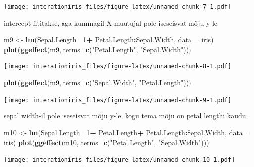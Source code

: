 \documentclass[]{book}
\newenvironment{Shaded}{\begin{snugshade}}{\end{snugshade}}
\newcommand{\KeywordTok}[1]{\textcolor[rgb]{0.13,0.29,0.53}{\textbf{#1}}}
\newcommand{\DataTypeTok}[1]{\textcolor[rgb]{0.13,0.29,0.53}{#1}}
\newcommand{\DecValTok}[1]{\textcolor[rgb]{0.00,0.00,0.81}{#1}}
\newcommand{\StringTok}[1]{\textcolor[rgb]{0.31,0.60,0.02}{#1}}
\newcommand{\OperatorTok}[1]{\textcolor[rgb]{0.81,0.36,0.00}{\textbf{#1}}}
\newcommand{\NormalTok}[1]{#1}
\begin{document}
\texttt{[image: interationiris\_files/figure-latex/unnamed-chunk-7-1.pdf]}

intercept fititakse, aga kummagil X-muutujal pole iseseisvat mõju y-le

\begin{Shaded}
\begin{Highlighting}[]
\NormalTok{m9 <-}\StringTok{ }\KeywordTok{lm}\NormalTok{(Sepal.Length}\OperatorTok{~}\StringTok{ }\DecValTok{1}\OperatorTok{+}\StringTok{ }\NormalTok{Petal.Length}\OperatorTok{:}\NormalTok{Sepal.Width, }\DataTypeTok{data =}\NormalTok{ iris)}
\KeywordTok{plot}\NormalTok{(}\KeywordTok{ggeffect}\NormalTok{(m9, }\DataTypeTok{terms=}\KeywordTok{c}\NormalTok{(}\StringTok{"Petal.Length"}\NormalTok{, }\StringTok{"Sepal.Width"}\NormalTok{)))}
\end{Highlighting}
\end{Shaded}

\texttt{[image: interationiris\_files/figure-latex/unnamed-chunk-8-1.pdf]}

\begin{Shaded}
\begin{Highlighting}[]
\KeywordTok{plot}\NormalTok{(}\KeywordTok{ggeffect}\NormalTok{(m9, }\DataTypeTok{terms=}\KeywordTok{c}\NormalTok{(}\StringTok{"Sepal.Width"}\NormalTok{, }\StringTok{"Petal.Length"}\NormalTok{)))}
\end{Highlighting}
\end{Shaded}

\texttt{[image: interationiris\_files/figure-latex/unnamed-chunk-9-1.pdf]}

sepal width-il pole iseseisvat mõju y-le. kogu tema mõju on petal
lengthi kaudu.

\begin{Shaded}
\begin{Highlighting}[]
\NormalTok{m10 <-}\StringTok{ }\KeywordTok{lm}\NormalTok{(Sepal.Length}\OperatorTok{~}\StringTok{ }\DecValTok{1}\OperatorTok{+}\StringTok{ }\NormalTok{Petal.Length}\OperatorTok{+}\StringTok{ }\NormalTok{Petal.Length}\OperatorTok{:}\NormalTok{Sepal.Width, }\DataTypeTok{data =}\NormalTok{ iris)}
\KeywordTok{plot}\NormalTok{(}\KeywordTok{ggeffect}\NormalTok{(m10, }\DataTypeTok{terms=}\KeywordTok{c}\NormalTok{(}\StringTok{"Petal.Length"}\NormalTok{, }\StringTok{"Sepal.Width"}\NormalTok{)))}
\end{Highlighting}
\end{Shaded}

\texttt{[image: interationiris\_files/figure-latex/unnamed-chunk-10-1.pdf]}
\end{document}
